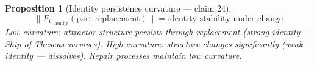 \documentclass[11pt,a4paper]{article}
\newtheorem{proposition}[definition]{Proposition}
\begin{document}
\begin{proposition}[Identity persistence curvature --- claim 24]
\label{prop:persist_curv}
\[
  \|F_{\nabla_{\text{identity}}}(\text{part\_replacement})\| =
    \text{identity stability under change}
\]
Low curvature: attractor structure persists through replacement (strong
identity --- Ship of Theseus survives). High curvature: structure changes
significantly (weak identity --- dissolves). Repair processes maintain
low curvature.
\end{proposition}
\end{document}
